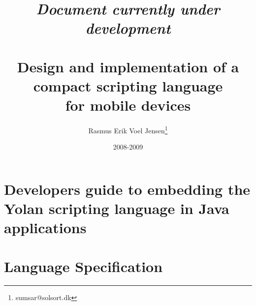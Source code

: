 \documentclass[12pt]{report}
\title{
\emph{Document currently under development} \\ ~ \\
Design and implementation of a \\
compact scripting language \\ 
for mobile devices}
\author{
  Rasmus Erik Voel Jensen\footnote{
    sumsar@solsort.dk
  }
}
\date{2008-2009}
\begin{document}

\maketitle

\setcounter{tocdepth}{1}
\tableofcontents
\nocite{sicp}


\chapter{Developers guide to embedding the Yolan scripting language in Java applications}

\chapter{Language Specification}


\newpage
{}



\appendix

\newpage
{}
\printindex
\end{document}

